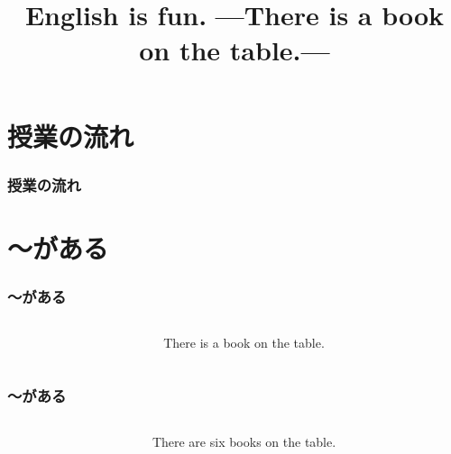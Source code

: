 \documentclass[aspectratio=169]{beamer}
\title{English is fun.\,\,{}---There is a book on the table.---}
\author{}
\institute[]{}
\date[]
\begin{document}
\begin{frame}[plain]
  \titlepage
\end{frame}

\section*{授業の流れ}
\begin{frame}[plain]
  \frametitle{授業の流れ}
  \tableofcontents
\end{frame}

\section{〜がある}

\begin{frame}[plain]\frametitle{〜がある}
\begin{columns}
\begin{column}{.45\textwidth}
\end{column}\pause
\begin{column}{.5\textwidth}\LARGE
There is a book on the table.
\end{column}
\end{columns}

\end{frame}


\begin{frame}[plain]\frametitle{〜がある}
\begin{columns}
\begin{column}{.45\textwidth}
\end{column}\pause
\begin{column}{.5\textwidth}\LARGE
There are six books on the table.
\end{column}
\end{columns}
\end{frame}
\end{document}
